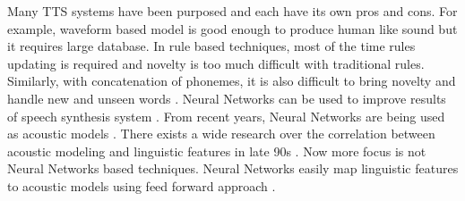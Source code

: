Many TTS systems have been purposed and each have its own pros and cons. For example, waveform based model is good enough to produce human like sound but it requires large database. In rule based techniques, most of the time rules updating is required and novelty is too much difficult with traditional rules. Similarly, with concatenation of phonemes, it is also difficult to bring novelty and handle new and unseen words \cite{karaali1998text, pitrelli2004tobi}. Neural Networks can be used to improve results of speech synthesis system \cite{muthukumar2016recurrent}. From recent years, Neural Networks are being used as acoustic models \cite{ling2015deep, zen2015acoustic}. There exists a wide research over the correlation between acoustic modeling and linguistic features in late 90s \cite{cawley1993lsp}. Now more focus is not Neural Networks based techniques. Neural Networks easily map linguistic features to acoustic models using feed forward approach \cite{lu2013combining, qian2014training, chen2015deep, ze2013statistical}. 